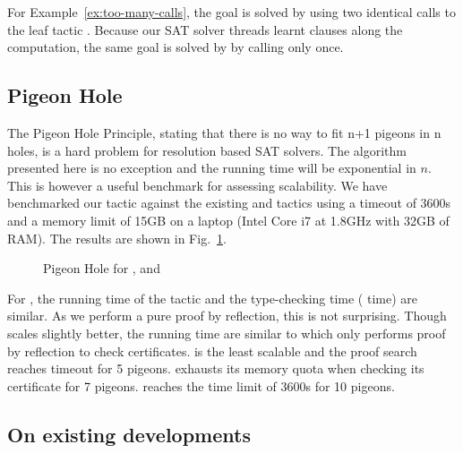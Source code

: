 \documentclass[utf8,a4paper,UKenglish,cleveref, autoref, thm-restate]{lipics-v2021}
\begin{document}
For Example~\ref{ex:too-many-calls}, the goal is solved by
 using two identical calls to the leaf tactic
.
%
Because our SAT solver threads learnt clauses along the computation,
the same goal is solved by  by calling
 only once.

\subsection{Pigeon Hole}

The Pigeon Hole Principle, stating that there is no way to fit n+1
pigeons in n holes, is a hard problem for resolution based SAT solvers.
%
The algorithm presented here is no exception and the running time will
be exponential in $n$. This is however a useful benchmark for
assessing scalability. We have benchmarked our  tactic
against the existing  and  tactics using a
timeout of 3600s and a memory limit of 15GB on a laptop (Intel Core i7
at 1.8GHz with 32GB of RAM).
%
The results are shown in Fig.~\ref{fig:pigeon}.
\begin{figure}
  \centering
  \qquad
  \caption{Pigeon Hole for ,  and }
  \label{fig:pigeon}
\end{figure}
For , the running time of the tactic and the type-checking
time ( time) are similar.  As we perform a pure proof by
reflection, this is not surprising.  Though  scales
slightly better, the running time are similar to  which
only performs proof by reflection to check certificates.
%
 is the least scalable and the proof search reaches
timeout for 5 pigeons.
%
 exhausts its memory quota when checking its certificate for 7 pigeons.
 reaches the time limit of 3600s for 10 pigeons.

\subsection{On existing developments}
\end{document}
